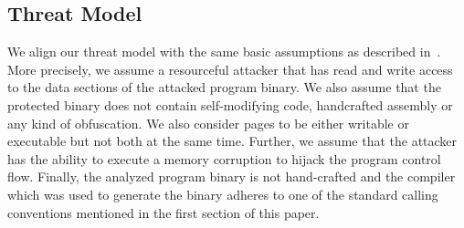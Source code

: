 % 




\subsection{Threat Model}
\label{Adversary Model}

We align our threat model with the same basic assumptions as described in~\cite{veen:typearmor}. 
More precisely, we assume a resourceful attacker that has read and write access to the data 
sections of the attacked program binary. We also assume that the protected binary does not contain 
self-modifying code, handcrafted assembly or any kind of obfuscation. We also consider pages 
to be either writable or executable but not both at the same time. Further, we assume 
that the attacker has the ability to execute a memory corruption to hijack the program
control flow. Finally, the analyzed program binary is not hand-crafted and the compiler
which was used to generate the binary adheres to one of the 
standard calling conventions mentioned in the first section of this paper.
